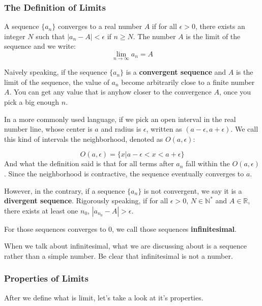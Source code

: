 \subsubsection{The Definition of Limits}

\begin{definition}
A sequence $\{a_n\}$ converges to a real number $A$ if for all $\epsilon > 0$, there exists an integer $N$ such that $|a_n - A|<\epsilon$ if $n\ge N$. The number $A$ is the limit of the sequence and we write:
\[\lim_{n \to \infty} a_n = A\]
\end{definition}
Naively speaking, if the sequence $\{a_n\}$ is a \textbf{convergent sequence} and $A$ is the limit of the sequence, the value of $a_n$ become arbitrarily close to a finite number $A$. You can get any value that is anyhow closer to the convergence $A$, once you pick a big enough $n$.

In a more commonly used language, if we pick an open interval in the real number line, whose center is $a$ and radius is $\epsilon$, written as $(a-\epsilon,a+\epsilon)$. We call this kind of intervals the neighborhood, denoted as $O(a,\epsilon)$:

\[O(a,\epsilon)=\{x|a-\epsilon < x < a+\epsilon\}\]
And what the definition said is that for all terms after $a_n$ fall within the $O(a,\epsilon)$. Since the neighborhood is contractive, the sequence eventually converges to $a$.

However, in the contrary, if a sequence $\{a_n\}$ is not convergent, we say it is a \textbf{divergent sequence}. Rigorously speaking, if for all $\epsilon > 0$, $N \in \mathbb{N}^*$ and $A \in \mathbb{R}$, there exists at least one $n_0$, $|a_{n_0} - A| > \epsilon$.

For those sequences converges to $0$, we call those sequences \textbf{infinitesimal}. 

\begin{remark}
When we talk about infinitesimal, what we are discussing about is a sequence rather than a simple number. Be clear that infinitesimal is not a number.
\end{remark}

\subsubsection{Properties of Limits}

After we define what is limit, let's take a look at it's properties.

